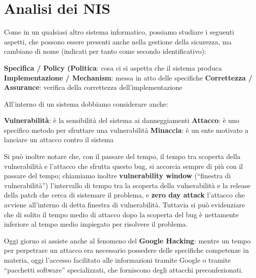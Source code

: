 \section{Analisi dei NIS}
Come in un qualsiasi altro sistema informatico, possiamo studiare i seguenti
aspetti, che possono essere presenti anche nella gestione della sicurezza,
ma cambiano di nome (indicati per tanto come secondo identificativo):
\begin{itemize}
\diam \textbf{Specifica / Policy (Politica}: cosa ci si aspetta che il sistema produca
\diam \textbf{Implementazione / Mechanism}: messa in atto delle specifiche
\diam \textbf{Correttezza / Assurance}: verifica della correttezza dell'implementazione
\end{itemize}
All'interno di un sistema dobbiamo considerare anche:
\begin{itemize}
\diam \textbf{Vulnerabilità}: è la sensibilità del sistema ai danneggiamenti
\diam \textbf{Attacco}: è uno specifico metodo per sfruttare una vulnerabilità 
\diam \textbf{Minaccia}: è un ente motivato a lanciare un attacco contro il sistema
\end{itemize}

Si può inoltre notare che, con il passare del tempo, il tempo tra scoperta della
vulnerabilità e l'attacco che sfrutta questo bug, si accorcia sempre di più con
il passare del tempo; chiamiamo inoltre \textbf{vulnerability window} (``finestra
di vulnerabilità'') l'intervallo di tempo tra la scoperta della vulnerabilità
e la release della patch che cerca di sistemare il problema, e \textbf{zero day attack}
l'attacco che avviene all'interno di detta finestra di vulnerabilità. Tuttavia
si può evidenziare che di solito il tempo medio di attacco dopo la scoperta del bug è nettamente
inferiore al tempo medio impiegato per risolvere il problema.

Oggi giorno si assiste anche al fenomeno del \textbf{Google Hacking}: mentre un 
tempo per perpetrare un attacco era necessario possedere delle specifiche 
competenze in materia, oggi l'accesso facilitato alle informazioni tramite 
Google o tramite ``pacchetti software'' specializzati, che forniscono degli
attacchi preconfezionati.


